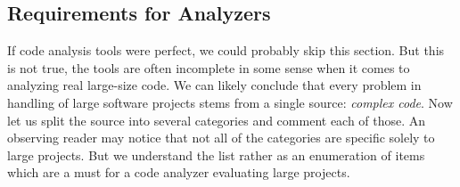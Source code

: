 \subsection{Requirements for Analyzers}
If code analysis tools were perfect, we could probably skip this section.
But this is not true, the tools are often incomplete in some sense when it
comes to analyzing real large-size code.  We can likely conclude that every
problem in handling of large software projects stems from a single source:
\emph{complex code}. Now let us split the source into several categories and
comment each of those. An observing reader may notice that not all of the
categories are specific solely to large projects. But we understand the list
rather as an enumeration of items which are a must for a code analyzer
evaluating large projects.


